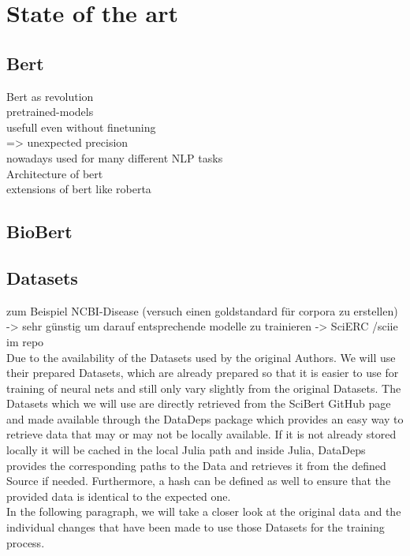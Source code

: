 \chapter{State of the art}
\section{Bert}
Bert as revolution\\
pretrained-models\\
usefull even without finetuning\\
=> unexpected precision\\

nowadays used for many different NLP tasks\\
Architecture of bert\\
extensions of bert like roberta\\
\section{BioBert}
\cite{Lee2019}
\section{Datasets}
zum Beispiel NCBI-Disease (versuch einen goldstandard für corpora zu erstellen)\\
-> sehr günstig um darauf entsprechende modelle zu trainieren \cite{Dogan2014}
-> SciERC /sciie im repo \cite{luan2018multitask}\\
Due to the availability of the Datasets used by the original Authors. We will use their prepared Datasets, which are already prepared so that it is easier to use for training of neural nets and still only vary slightly from the original Datasets. The Datasets which we will use are directly retrieved from the SciBert GitHub page and made available through the DataDeps package which provides an easy way to retrieve data that may or may not be locally available. If it is not already stored locally it will be cached in the local Julia path and inside Julia, DataDeps provides the corresponding paths to the Data and retrieves it from the defined Source if needed. Furthermore, a hash can be defined as well to ensure that the provided data is identical to the expected one.\cite{White2019}\\
In the following paragraph, we will take a closer look at the original data and the individual changes that have been made to use those Datasets for the training process.
